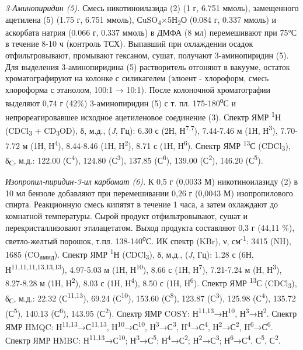\emph{3-Аминопиридин (5).} Смесь никотиноилазида (2) (1 г, 6.751 ммоль),
замещенного ацетилена (5) (1.75 г, 6.751 ммоль),
СuSO\textsubscript{4}×5Н\textsubscript{2}О (0.084 г, 0.337 ммоль) и
аскорбата натрия (0.066 г, 0.337 ммоль) в ДМФА (8 мл) перемешивают при
75°С в течение 8-10 ч (контроль ТСХ). Выпавший при охлаждении осадок
отфильтровывают, промывают гексаном, сушат, получают 3-аминопиридин (5).
Для выделения 3-аминопиридина (5) растворитель отгоняют в вакууме,
остаток хроматографируют на колонке с силикагелем (элюент - хлороформ,
смесь хлороформа с этанолом, 100:1 → 10:1). После колоночной
хроматографии выделяют 0,74 г (42\%) 3-аминопиридин (5) с т. пл.
175-180\textsuperscript{о}С и непрореагировавшее исходное ацетиленовое
соединение (3). Спектр ЯМР \textsuperscript{1}Н (CDCl\textsubscript{3} +
CD\textsubscript{3}OD), δ, м.д., (\emph{J}, Гц): 6.30 с (2Н,
Н\textsuperscript{7,7}), 7.44-7.46 м (1Н, Н\textsuperscript{3}),
7.70-7.72 м (1Н, Н\textsuperscript{4}), 8.44-8.46 (1Н,
Н\textsuperscript{2}), 8.71 с (1Н, Н\textsuperscript{6}). Спектр ЯМР
\textsuperscript{13}С (CDCl\textsubscript{3}), δ\textsubscript{С}, м.д.:
122.00 (С\textsuperscript{4}), 124.80 (С\textsuperscript{3}), 137.85
(С\textsuperscript{6}), 139.00 (С\textsuperscript{2}), 146.20
(С\textsuperscript{5}).

\emph{Изопропил-пиридин-3-ил карбомат (6).} К 0,5 г (0,0033 М)
никотиноилазиду (2) в 10 мл бензоле добавляют при перемешивании 0,26 г
(0,0043 М) изопропилового спирта. Реакционную смесь кипятят в течение 1
часа, а затем охлаждают до комнатной температуры. Сырой продукт
отфильтровывают, сушат и перекристаллизовают этилацетатом. Выход
продукта составляют 0,3 г (44,11 \%), светло-желтый порошок, т.пл.
138-140\textsuperscript{о}С. ИК спектр (KBr), ν, см\textsuperscript{-1}:
3415 (NH), 1685 (CO\textsubscript{амид}). Спектр ЯМР
\textsuperscript{1}Н (CDCl\textsubscript{3}), δ, м.д., (\emph{J}, Гц):
1.28 с (6Н, Н\textsuperscript{11,11,11,13,13,13}), 4.97-5.03 м (1Н,
Н\textsuperscript{10}), 8.66 с (1Н, Н\textsuperscript{7}), 7.21-7.24 м
(Н, Н\textsuperscript{3}), 8.27-8.28 м (1Н, Н\textsuperscript{2}), 8.03
с (1Н, Н\textsuperscript{4}), 8.50 с (1Н, Н\textsuperscript{6}). Спектр
ЯМР \textsuperscript{13}С (CDCl\textsubscript{3}), δ\textsubscript{С},
м.д.: 22.32 (С\textsuperscript{11,13}), 69.24 (С\textsuperscript{10}),
153.60 (С\textsuperscript{8}), 123.87 (С\textsuperscript{3}), 125.98
(С\textsuperscript{4}), 135.72 (С\textsuperscript{5}), 140.13
(С\textsuperscript{6}), 143.95 (С\textsuperscript{2}). Спектр ЯМР COSY:
Н\textsuperscript{11,13}→Н\textsuperscript{10},
Н\textsuperscript{3}→Н\textsuperscript{2}. Спектр ЯМР HMQC:
Н\textsuperscript{11,13}→С\textsuperscript{11,13},
Н\textsuperscript{10}→С\textsuperscript{10},
Н\textsuperscript{3}→С\textsuperscript{3},
H\textsuperscript{4}→С\textsuperscript{4},
Н\textsuperscript{2}→С\textsuperscript{2},
H\textsuperscript{6}→С\textsuperscript{6}. Спектр ЯМР HMBC:
Н\textsuperscript{11,13}→С\textsuperscript{10};
Н\textsuperscript{3}→С\textsuperscript{5};
Н\textsuperscript{4}→С\textsuperscript{2};
Н\textsuperscript{2}→С\textsuperscript{3};
Н\textsuperscript{6}→С\textsuperscript{4}, С\textsuperscript{5},
С\textsuperscript{2}.

